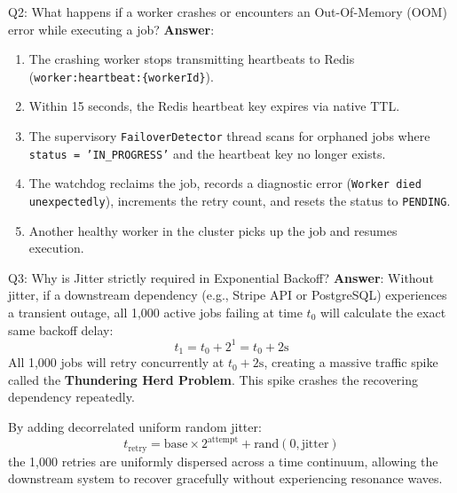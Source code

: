 \documentclass[11pt,a4paper]{article}
\begin{document}
\begin{interviewbox}{Q2: What happens if a worker crashes or encounters an Out-Of-Memory (OOM) error while executing a job?}
\textbf{Answer}:
\begin{enumerate}
    \item The crashing worker stops transmitting heartbeats to Redis (\texttt{worker:heartbeat:\{workerId\}}).
    \item Within 15 seconds, the Redis heartbeat key expires via native TTL.
    \item The supervisory \texttt{FailoverDetector} thread scans for orphaned jobs where \texttt{status = 'IN\_PROGRESS'} and the heartbeat key no longer exists.
    \item The watchdog reclaims the job, records a diagnostic error (\texttt{Worker died unexpectedly}), increments the retry count, and resets the status to \texttt{PENDING}.
    \item Another healthy worker in the cluster picks up the job and resumes execution.
\end{enumerate}
\end{interviewbox}

\begin{interviewbox}{Q3: Why is Jitter strictly required in Exponential Backoff?}
\textbf{Answer}:
Without jitter, if a downstream dependency (e.g., Stripe API or PostgreSQL) experiences a transient outage, all 1,000 active jobs failing at time $t_0$ will calculate the exact same backoff delay:
\[ t_1 = t_0 + 2^1 = t_0 + 2\text{s} \]
All 1,000 jobs will retry concurrently at $t_0 + 2\text{s}$, creating a massive traffic spike called the \textbf{Thundering Herd Problem}. This spike crashes the recovering dependency repeatedly. 

By adding decorrelated uniform random jitter:
\[ t_{\text{retry}} = \text{base} \times 2^{\text{attempt}} + \text{rand}(0, \text{jitter}) \]
the 1,000 retries are uniformly dispersed across a time continuum, allowing the downstream system to recover gracefully without experiencing resonance waves.
\end{interviewbox}
\end{document}
